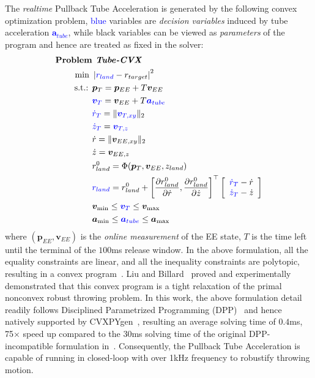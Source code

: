 \documentclass[letterpaper, 10 pt, conference]{ieeeconf} %
\begin{document}
The \emph{realtime} Pullback Tube Acceleration is generated by the following convex optimization problem,  \textcolor{blue}{blue} variables are \emph{decision variables} induced by tube acceleration \textcolor{blue}{$\bm{a}_{tube}$}, while black variables can be viewed as \emph{parameters} of the program and hence are treated as fixed in the solver:
\begin{align*}
\textbf{Problem} &\textbf{\textit{ Tube}} \textbf{\textit{{-CVX}}}\\
\text { min  } & \left|\textcolor{blue}{r_{land}} - r_{target}\right |^2 \quad \\
\text { s.t.: } 
& \textcolor{black}{\bm{p}_{T} = \bm{p}_{EE} + T \bm{v}_{EE}}\\
& \textcolor{blue}{\bm{v}_{T}} = \bm{v}_{EE} + T \textcolor{blue}{\bm{a}_{tube}}\\
& \textcolor{blue}{\dot{r}_T} = \|\textcolor{blue}{\bm{v}_{T,xy}}\|_2\\
& \textcolor{blue}{\dot{z}_T} = \textcolor{blue}{\bm{v}_{T,z}} \\
&\dot{r}=\|\bm{v}_{EE, xy}\|_2\\
&\dot{z} = \bm{v}_{EE, z}\\
& r_{land}^0 = \Phi(\bm{p}_{T}, \bm{v}_{EE}, z_{land}) \\
& \textcolor{blue}{r_{land}} = r_{land}^0+ \left[\frac{\partial r_{land}^0}{\partial \dot{r}}, \frac{\partial r_{land}^0}{\partial \dot{z}}\right]^\top\left[\begin{array}{c}
\textcolor{blue}{\dot{r}_{T}}-\dot{r} \\
\textcolor{blue}{\dot{z}_{T}}-\dot{z}
\end{array}\right]\\
& \bm{v}_{\min } \leq \textcolor{blue}{\bm{v}_{T}}  \leq \bm{v}_{\max }\\
& \bm{a}_{\min } \leq \textcolor{blue}{\bm{a}_{tube}}  \leq \bm{a}_{\max }
\label{opt-convex}
\end{align*}
\noindent where $(\bm{p}_{EE},\bm{v}_{EE})$ is the \emph{online measurement} of the EE state, $T$ is the time left until the terminal of the $100$ms release window. In the above formulation, all the equality constraints are linear, and all the inequality constraints are polytopic, resulting in a convex program~\cite{boyd2004convex}. Liu and Billard~\cite{liu2024tube} proved and experimentally demonstrated that this convex program is a tight relaxation of the primal nonconvex robust throwing problem. In this work, the above formulation detail readily follows Disciplined Parametrized Programming (DPP)~\cite{agrawal2019differentiable} and hence natively supported by CVXPYgen~\cite{schaller2022embedded}, resulting an average solving time of $0.4$ms, 75$\times$ speed up compared to the $30$ms solving time of the original DPP-incompatible formulation in~\cite{liu2024tube}. Consequently, the Pullback Tube Acceleration is capable of running in closed-loop with over 1kHz frequency to robustify throwing motion. 
\end{document}
